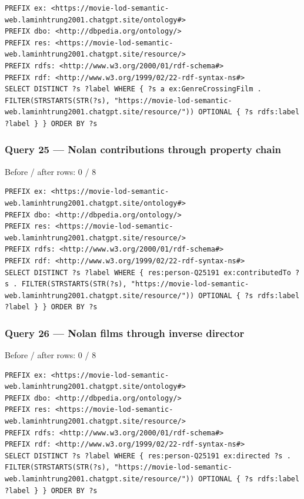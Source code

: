 \documentclass[
  11pt,
]{article}
\begin{document}
\begin{verbatim}
PREFIX ex: <https://movie-lod-semantic-web.laminhtrung2001.chatgpt.site/ontology#>
PREFIX dbo: <http://dbpedia.org/ontology/>
PREFIX res: <https://movie-lod-semantic-web.laminhtrung2001.chatgpt.site/resource/>
PREFIX rdfs: <http://www.w3.org/2000/01/rdf-schema#>
PREFIX rdf: <http://www.w3.org/1999/02/22-rdf-syntax-ns#>
SELECT DISTINCT ?s ?label WHERE { ?s a ex:GenreCrossingFilm . FILTER(STRSTARTS(STR(?s), "https://movie-lod-semantic-web.laminhtrung2001.chatgpt.site/resource/")) OPTIONAL { ?s rdfs:label ?label } } ORDER BY ?s
\end{verbatim}

\subsubsection{\texorpdfstring{Query 25 --- Nolan
contribu\allowbreak{}tions through property
chain}{Query 25 --- Nolan  through property chain}}\label{query-25-nolan-contributions-through-property-chain}

Before / after rows: 0 / 8

\begin{verbatim}
PREFIX ex: <https://movie-lod-semantic-web.laminhtrung2001.chatgpt.site/ontology#>
PREFIX dbo: <http://dbpedia.org/ontology/>
PREFIX res: <https://movie-lod-semantic-web.laminhtrung2001.chatgpt.site/resource/>
PREFIX rdfs: <http://www.w3.org/2000/01/rdf-schema#>
PREFIX rdf: <http://www.w3.org/1999/02/22-rdf-syntax-ns#>
SELECT DISTINCT ?s ?label WHERE { res:person-Q25191 ex:contributedTo ?s . FILTER(STRSTARTS(STR(?s), "https://movie-lod-semantic-web.laminhtrung2001.chatgpt.site/resource/")) OPTIONAL { ?s rdfs:label ?label } } ORDER BY ?s
\end{verbatim}

\subsubsection{Query 26 --- Nolan films through inverse
director}\label{query-26-nolan-films-through-inverse-director}

Before / after rows: 0 / 8

\begin{verbatim}
PREFIX ex: <https://movie-lod-semantic-web.laminhtrung2001.chatgpt.site/ontology#>
PREFIX dbo: <http://dbpedia.org/ontology/>
PREFIX res: <https://movie-lod-semantic-web.laminhtrung2001.chatgpt.site/resource/>
PREFIX rdfs: <http://www.w3.org/2000/01/rdf-schema#>
PREFIX rdf: <http://www.w3.org/1999/02/22-rdf-syntax-ns#>
SELECT DISTINCT ?s ?label WHERE { res:person-Q25191 ex:directed ?s . FILTER(STRSTARTS(STR(?s), "https://movie-lod-semantic-web.laminhtrung2001.chatgpt.site/resource/")) OPTIONAL { ?s rdfs:label ?label } } ORDER BY ?s
\end{verbatim}
\end{document}
